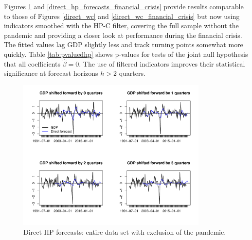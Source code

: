 \documentclass[11pt,a4paper]{article}
\begin{document}
Figures \ref{direct_hp_forecasts} and \ref{direct_hp_forecasts_financial_crisis} provide results comparable to those of Figures \ref{direct_wc} and \ref{direct_wc_financial_crisis} but now using indicators smoothed with the HP-C filter, covering the full sample without the pandemic and providing a closer look at performance during the financial crisis.  The fitted values lag GDP slightly less and track turning points somewhat more quickly. Table \ref{tab:pvaluedhp} shows p-values for tests of the joint null hypothesis that all coefficients $\hat{\beta} = 0$. The use of filtered indicators improves their statistical significance at forecast horizons $h > 2$ quarters. 

\begin{figure}[H]
    \begin{center}
        \includegraphics[width=0.85\textwidth]{./Figures/direct_hp_forecasts.pdf}
        \caption{Direct HP forecasts: entire data set with exclusion of the pandemic.
        \label{direct_hp_forecasts}}
    \end{center}
\end{figure}
\end{document}
